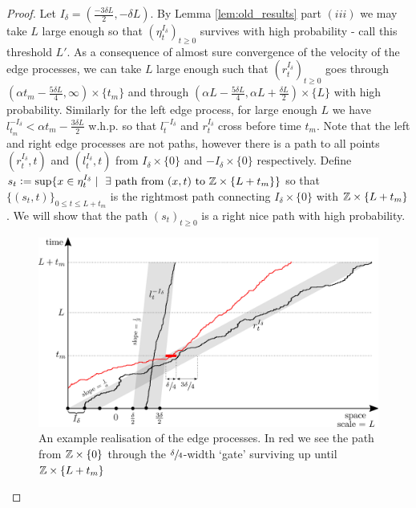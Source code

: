 \begin{proof}
Let $I_\delta = \left( \frac{ - 3 \delta L}{2}, - \delta L \right)$. By Lemma \ref{lem:old_results} part $(iii)$ we may take $L$ large enough so that $(\eta^{I_\delta}_t)_{t \geq 0}$ survives with high probability - call this threshold $L'$. As a consequence of almost sure convergence of the velocity of the edge processes, we can take $L$ large enough such that $(r^{I_\delta}_t)_{t \geq 0}$ goes through $(\alpha t_m  - \frac{5 \delta L }{4}, \infty) \times \{t_m\}$ and through $(\alpha L - \frac{5 \delta L}{4}, \alpha L + \frac{\delta L}{2}) \times \{L\}$ with high probability. Similarly for the left edge process, for large enough $L$ we have $l^{- I_\delta}_{t_m} < \alpha t_m - \frac{3 \delta L}{2}$ w.h.p. so that $l^{- I_\delta}_t$ and $r^{I_\delta}_t$ cross before time $t_m$. Note that the left and right edge processes are not paths, however there is a path to all points $(r^{I_\delta}_t, t)$ and $(l^{I_\delta}_t, t)$ from $I_\delta \times \{0\}$ and $-I_\delta \times \{0\}$ respectively. Define $s_t \vcentcolon= \sup\{x \in \eta^{I_\delta}_t \mid\ \exists \text{ path from } (x, t) \text{ to } \mathbb{Z} \times \{L + t_m \} \}$ so that $\{(s_t, t)\}_{0 \leq t \leq L + t_m}$ is the rightmost path connecting $I_\delta \times \{0\}$ with $\mathbb{Z} \times \{L + t_m\}$. We will show that the path $(s_t)_{t \geq 0}$ is a right nice path with high probability. \\

\begin{figure}[!h]
  \includegraphics[width=\linewidth]{images/construction_right}
  \caption{An example realisation of the edge processes. In red we see the path from $\mathbb{Z} \times \{0\}$ through the $\sfrac{\delta}{4}$-width `gate' surviving up until $\mathbb{Z} \times \{L + t_m\}$ }
  \label{fig:construction_right}
\end{figure}


\end{proof}
